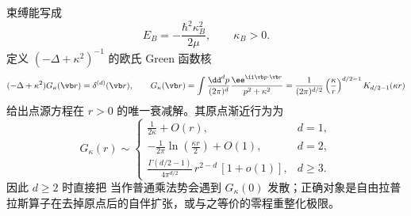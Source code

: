 束缚能写成
\[
E_B=-\frac{\hbar^2\kappa_B^2}{2\mu},\qquad \kappa_B>0.
\]
定义 $(-\Delta+\kappa^2)^{-1}$ 的欧氏 Green 函数核
\begin{equation}
(-\Delta+\kappa^2)G_\kappa(\vb r)=\delta^{(d)}(\vb r),
\qquad
G_\kappa(\vb r)=
\int\frac{\dd^d p}{(2\pi)^d}
\frac{\ee^{\ii\vb p\cdot\vb r}}{p^2+\kappa^2}
=
\frac{1}{(2\pi)^{d/2}}
\left(\frac{\kappa}{r}\right)^{d/2-1}
K_{d/2-1}(\kappa r)
\label{eq:phys-hdqm-delta-bound-green}
\end{equation}
给出点源方程在 $r>0$ 的唯一衰减解。其原点渐近行为为
\begin{equation}
G_\kappa(r)\sim
\begin{cases}
\displaystyle \frac{1}{2\kappa}+O(r), & d=1,\\[0.5em]
\displaystyle -\frac{1}{2\pi}\ln\!\left(\frac{\kappa r}{2}\right)+O(1), & d=2,\\[0.5em]
\displaystyle \frac{\Gamma(d/2-1)}{4\pi^{d/2}}\,r^{2-d}\,[1+o(1)], & d\ge3.
\end{cases}
\label{eq:phys-hdqm-point-green-short-distance}
\end{equation}
因此 $d\ge2$ 时直接把 当作普通乘法势会遇到 $G_\kappa(0)$ 发散；正确对象是自由拉普拉斯算子在去掉原点后的自伴扩张，或与之等价的零程重整化极限。
